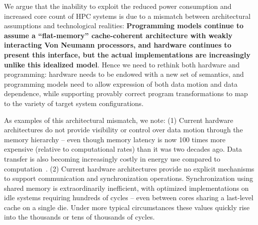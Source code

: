 


We argue that the inability to exploit the reduced power consumption and 
increased core count of HPC systems is due
to a mismatch between architectural assumptions and technological realities:
\textbf{Programming models continue to assume a ``flat-memory'' cache-coherent
architecture with weakly interacting Von Neumann processors, and
hardware continues to present this interface, but the actual implementations
are increasingly unlike this idealized model}. Hence
we need to rethink both hardware and programming: hardware needs to be
endowed with a new set of semantics, and programming models need to
allow expression of both data motion and data dependence, while supporting
provably correct program transformations to map to the variety of target
system configurations.

As examples of this architectural mismatch, we note:  
(1) Current hardware architectures do not provide visibility or control over
data motion through the memory hierarchy -- even though memory latency
is now 100 times more expensive (relative to computational rates) than it
was two decades ago.  Data transfer is also becoming increasingly costly
in energy use compared to computation~\cite{ITRS_Update_2012}.
(2) Current hardware architectures provide no explicit mechanisms to
support communication and synchronization operations.   
Synchronization using shared memory is extraordinarily inefficient,
with optimized implementations on idle systems requiring hundreds of cycles
-- even between cores sharing a last-level cache on a single die.  Under
more typical circumstances these values quickly rise into the thousands
or tens of thousands of cycles.


\begin{comment}
As key examples: (1) in current hardware technology data movement 
has a higher cost in latency and energy than arithmetic computation 
and this imbalance is projected to increase over 
time~\cite{ITRS_Update_2012}; and (2) current technologies are also lacking efficient user-accessible mechanisms
for communication and synchronization.  These are routinely implemented
with high efficiency in hardware, but architectures must make these mechanisms
available to code.
\end{comment}


